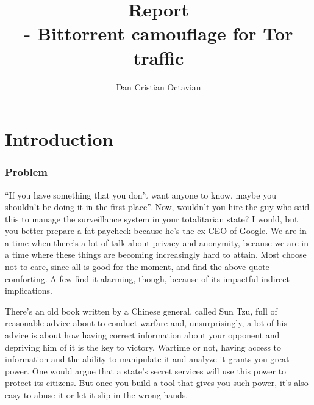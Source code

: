 \documentclass[11pt]{book} %
\title{Report \\ \projectName- Bittorrent camouflage for Tor traffic}
\author{Dan Cristian Octavian}
\begin{document}
\newcommand{\myparagraph}[1]{\paragraph{#1}\mbox{}\\}
\maketitle

\newpage


\listoftodos

\tableofcontents

\newpage



\chapter{Introduction}


\subsection{Problem}


 “If you have something that you don’t want anyone to know, maybe you shouldn’t be doing it in the first place”. Now, wouldn’t you hire the guy who said this to manage the surveillance system in your totalitarian state? I would, but you better prepare a fat paycheck because he’s the ex-CEO of Google. We are in a time when there’s a lot of talk about privacy and anonymity, because we are in a time where these things are becoming increasingly hard to attain. Most choose not to care, since all is good for the moment, and find the above quote comforting. A few find it alarming, though, because of its impactful indirect implications.

There’s an old book written by a Chinese general, called Sun Tzu, full of reasonable advice about to conduct warfare and, unsurprisingly, a lot of his advice is about how having correct information about your opponent and depriving him of it is the key to victory. Wartime or not, having access to information and the ability to manipulate it and analyze it grants you great power. One would argue that a state’s secret services will use this power to protect its citizens. But once you build a tool that gives you such power, it’s also easy to abuse it or let it slip in the wrong hands.
\end{document}
